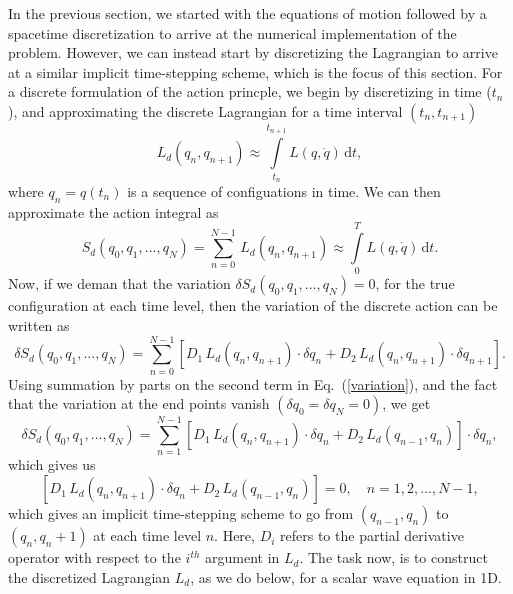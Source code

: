 \documentclass[nofootinbib,preprintnumbers,superscriptaddress,notitlepage]{revtex4-1}
\newcommand{\<}{\begin{equation}}
\newcommand{\?}{\end{equation}}
\begin{document}
In the previous section, we started with the equations of motion followed by a
spacetime discretization to arrive at the numerical implementation of the
problem. However, we can instead start by discretizing the Lagrangian to
arrive at a similar implicit time-stepping scheme, which is the focus of this
section. For a discrete formulation of the action princple, we begin by
discretizing in time ($t_n$), and approximating the discrete Lagrangian for a
time interval $(t_n, t_{n+1})$
\begin{equation}
\label{discretized_lagrangian}
L_d(q_{n}, q_{n+1}) \approx \int\limits_{t_n}^{t_{n+1}} L(q, \dot{q})\, \textrm{d}t,
\end{equation}
where $q_n = q(t_n)$ is a sequence of configuations in time. We can then
approximate the action integral as
\begin{equation}
S_d(q_0, q_1, ..., q_N) = \sum\limits_{n=0}^{N-1} \,L_d (q_n, q_{n+1})
\approx \int\limits_{0}^{T} L(q, \dot{q})\, \textrm{d}t.
\end{equation}
Now, if we deman that the variation $\delta S_d(q_0, q_1, ..., q_N) = 0$, for
the true configuration at each time level, then the variation of the discrete
action can be written as
\begin{equation}
\label{variation}
\delta S_d(q_0, q_1, ..., q_N) = \sum\limits_{n=0}^{N-1} \left[D_1 \,L_d (q_n, q_{n+1})\cdot \delta q_n 
+ D_2\,L_d (q_n, q_{n+1})\cdot \delta q_{n+1}\right].
\end{equation}
Using summation by parts on the second term in Eq.~(\ref{variation}), and the
fact that the variation at the end points vanish $(\delta q_0 = \delta q_N = 0)$,
we get
\begin{equation}
\delta S_d(q_0, q_1, ..., q_N) = \sum\limits_{n=1}^{N-1}  \left[ D_1 \,L_d (q_{n}, q_{n+1})\cdot \delta q_n 
+ D_2\,L_d (q_{n-1}, q_{n}) \right] \cdot \delta q_{n},
\end{equation}
which gives us
\begin{equation}
\label{finalform_variational}
 \left[ D_1 \,L_d (q_{n}, q_{n+1})\cdot \delta q_n 
+ D_2\,L_d (q_{n-1}, q_{n}) \right] = 0, \quad n = 1, 2,...,N-1,
\end{equation}
which gives an implicit time-stepping scheme to go from $(q_{n-1}, q_n)$ to $(q_n, q_n+1)$ at each time level $n$. Here, $D_i$ refers to the 
partial derivative operator with respect to the $i^{th}$ argument in $L_{d}$. The task now, is to construct the discretized
Lagrangian $L_d$, as we do below, for a scalar wave equation in 1D. \\
\end{document}

